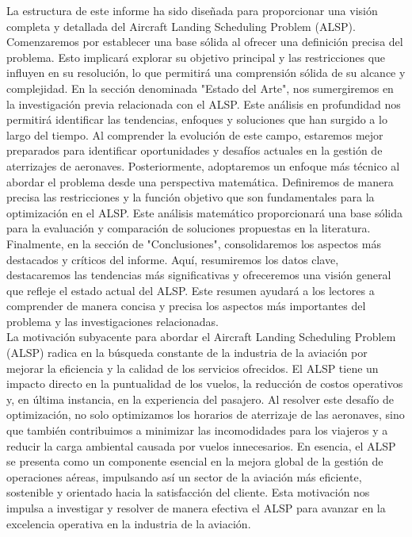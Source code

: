 \documentclass[letter, 10pt]{article}
\begin{document}
La estructura de este informe ha sido dise\~{n}ada para proporcionar una visi\'on completa y detallada del Aircraft Landing Scheduling Problem (ALSP). Comenzaremos por establecer una base s\'olida al ofrecer una definici\'on precisa del problema. Esto implicar\'a explorar su objetivo principal y las restricciones que influyen en su resoluci\'on, lo que permitir\'a una comprensi\'on s\'olida de su alcance y complejidad. En la secci\'on denominada "Estado del Arte", nos sumergiremos en la investigaci\'on previa relacionada con el ALSP. Este an\'alisis en profundidad nos permitir\'a identificar las tendencias, enfoques y soluciones que han surgido a lo largo del tiempo. Al comprender la evoluci\'on de este campo, estaremos mejor preparados para identificar oportunidades y desaf\'ios actuales en la gesti\'on de aterrizajes de aeronaves. Posteriormente, adoptaremos un enfoque m\'as t\'ecnico al abordar el problema desde una perspectiva matem\'atica. Definiremos de manera precisa las restricciones y la funci\'on objetivo que son fundamentales para la optimizaci\'on en el ALSP. Este an\'alisis matem\'atico proporcionar\'a una base s\'olida para la evaluaci\'on y comparaci\'on de soluciones propuestas en la literatura. Finalmente, en la secci\'on de "Conclusiones", consolidaremos los aspectos m\'as destacados y cr\'iticos del informe. Aqu\'i, resumiremos los datos clave, destacaremos las tendencias m\'as significativas y ofreceremos una visi\'on general que refleje el estado actual del ALSP. Este resumen ayudar\'a a los lectores a comprender de manera concisa y precisa los aspectos m\'as importantes del problema y las investigaciones relacionadas.\\


La motivaci\'on subyacente para abordar el Aircraft Landing Scheduling Problem (ALSP) radica en la b\'usqueda constante de la industria de la aviaci\'on por mejorar la eficiencia y la calidad de los servicios ofrecidos. El ALSP tiene un impacto directo en la puntualidad de los vuelos, la reducci\'on de costos operativos y, en \'ultima instancia, en la experiencia del pasajero. Al resolver este desaf\'io de optimizaci\'on, no solo optimizamos los horarios de aterrizaje de las aeronaves, sino que tambi\'en contribuimos a minimizar las incomodidades para los viajeros y a reducir la carga ambiental causada por vuelos innecesarios. En esencia, el ALSP se presenta como un componente esencial en la mejora global de la gesti\'on de operaciones a\'ereas, impulsando as\'i un sector de la aviaci\'on m\'as eficiente, sostenible y orientado hacia la satisfacci\'on del cliente. Esta motivaci\'on nos impulsa a investigar y resolver de manera efectiva el ALSP para avanzar en la excelencia operativa en la industria de la aviaci\'on.
\end{document}
